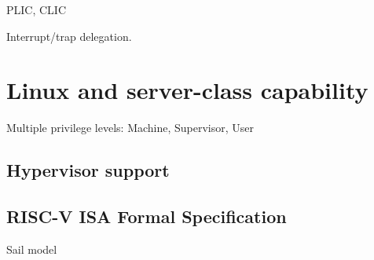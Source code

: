 PLIC, CLIC

Interrupt/trap delegation.


\section{Linux and server-class capability}

Multiple privilege levels: Machine, Supervisor, User

\subsection{Hypervisor support}



\subsection{RISC-V ISA Formal Specification}

Sail model

